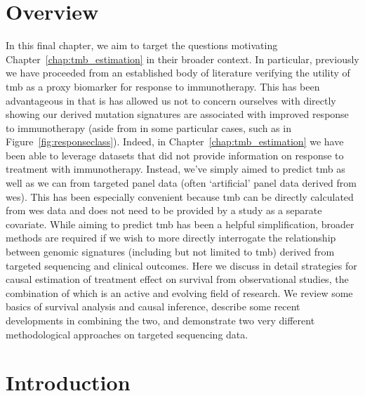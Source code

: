 \documentclass[../thesis.tex]{subfiles}
\begin{document}
\section*{Overview}
In this final chapter, we aim to target the questions motivating Chapter~\ref{chap:tmb_estimation} in their broader context. In particular, previously we have proceeded from an established body of literature verifying the utility of \gls{tmb} as a proxy biomarker for response to immunotherapy. This has been advantageous in that is has allowed us not to concern ourselves with directly showing our derived mutation signatures are associated with improved response to immunotherapy (aside from in some particular cases, such as in Figure~\ref{fig:responseclass}). Indeed, in Chapter~\ref{chap:tmb_estimation} we have been able to leverage datasets that did not provide information on response to treatment with immunotherapy. Instead, we've simply aimed to predict \gls{tmb} as well as we can from targeted panel data (often `artificial' panel data derived from \gls{wes}). This has been especially convenient because \gls{tmb} can be directly calculated from \gls{wes} data and does not need to be provided by a study as a separate covariate.  While aiming to predict \gls{tmb} has been a helpful simplification, broader methods are required if we wish to more directly interrogate the relationship between genomic signatures (including but not limited to \gls{tmb}) derived from targeted sequencing and clinical outcomes. Here we discuss in detail strategies for causal estimation of treatment effect on survival from observational studies, the combination of which is an active and evolving field of research. We review some basics of survival analysis and causal inference, describe some recent developments in combining the two, and demonstrate two very different methodological approaches on targeted sequencing data.

\section{Introduction}
\end{document}

